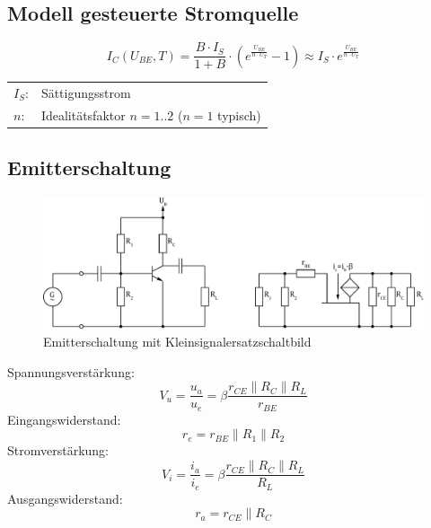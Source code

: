 \subsection{Modell gesteuerte Stromquelle}
\[ I_C(U_{BE}, T) = \frac{B \cdot I_S}{1 + B} 
\cdot \left(e^{\frac{U_{BE}}{n \cdot U_T}} - 1\right) 
\approx I_S \cdot e^{\frac{U_{BE}}{n \cdot U_T}} \]
\begin{tabular}{@{}ll}
  $I_S$:	    & Sättigungsstrom \\
  $n$:	        & Idealitätsfaktor $n = 1..2$ ($n = 1$ typisch) \\
\end{tabular}

\subsection{Emitterschaltung}
\begin{figure}[h!]
	\centering
	\includegraphics[width = \linewidth]{../fig/trans_emitter.pdf}
	\caption{Emitterschaltung mit Kleinsignalersatzschaltbild}
	\label{trans:emitterschaltung}
\end{figure}
\noindent
Spannungsverstärkung:
\[
	V_u = \frac{u_a}{u_e} = \beta \frac{r_{CE} \parallel R_C \parallel R_L}{r_{BE}}
\]
Eingangswiderstand:
\[
	r_e = r_{BE} \parallel R_1 \parallel R_2
\]
Stromverstärkung:
\[
	V_i = \frac{i_a}{i_e} = \beta \frac{r_{CE} \parallel R_C \parallel R_L}{R_L}
\]
Ausgangswiderstand:
\[
	r_a = r_{CE} \parallel R_C
\]

\newpage
